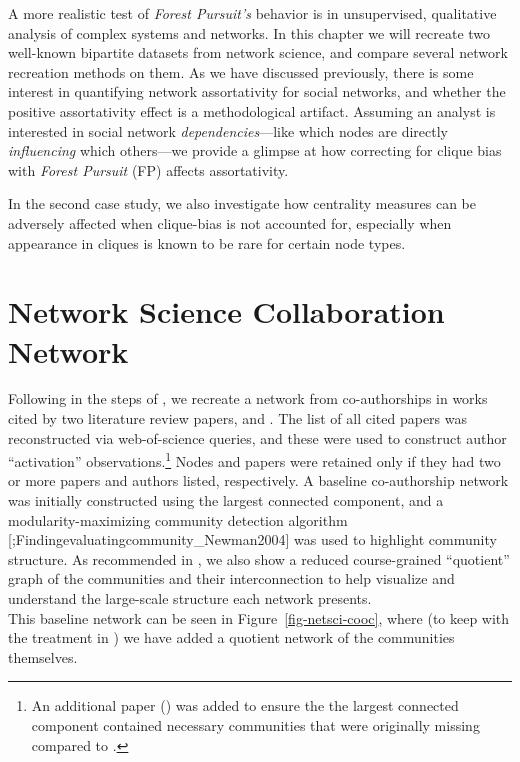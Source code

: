\documentclass[%
	12pt,
		oneside,
		letterpaper
]{book}
\begin{document}
A more realistic test of \emph{Forest Pursuit's} behavior is in unsupervised, qualitative analysis of complex systems and networks.
In this chapter we will recreate two well-known bipartite datasets from network science, and compare several network recreation methods on them.
As we have discussed previously\autocite{PerceivedAssortativitySocial_Fisher2017}, there is some interest in quantifying network assortativity for social networks, and whether the positive assortativity effect is a methodological artifact.
Assuming an analyst is interested in social network \emph{dependencies}---like which nodes are directly \emph{influencing} which others---we provide a glimpse at how correcting for clique bias with \emph{Forest Pursuit} (FP) affects assortativity.

In the second case study, we also investigate how centrality measures can be adversely affected when clique-bias is not accounted for, especially when appearance in cliques is known to be rare for certain node types.

\section{Network Science Collaboration Network}\label{network-science-collaboration-network}

Following in the steps of \textcite{Findingevaluatingcommunity_Newman2004}, we recreate a network from co-authorships in works cited by two literature review papers, \textcite{StructureFunctionComplex_Newman2003} and \textcite{ComplexnetworksStructure_BOCCALETTI2006}.
The list of all cited papers was reconstructed via web-of-science queries, and these were used to construct author ``activation'' observations.\footnote{
  An additional paper (\textcite{Coherentnoisescale_Sneppen1997}) was added to ensure the the largest connected component contained necessary communities that were originally missing compared to \textcite{Findingevaluatingcommunity_Newman2004}.}
Nodes and papers were retained only if they had two or more papers and authors listed, respectively.
A baseline co-authorship network was initially constructed using the largest connected component, and a modularity-maximizing community detection algorithm {[}\textcite{Findingcommunitystructure_Clauset2004};Findingevaluatingcommunity\_Newman2004{]} was used to highlight community structure.
As recommended in \textcite{Findingevaluatingcommunity_Newman2004}, we also show a reduced course-grained ``quotient'' graph of the communities and their interconnection to help visualize and understand the large-scale structure each network presents.\\
This baseline network can be seen in Figure~\ref{fig-netsci-cooc}, where (to keep with the treatment in \textcite{Findingevaluatingcommunity_Newman2004}) we have added a quotient network of the communities themselves.
\end{document}
